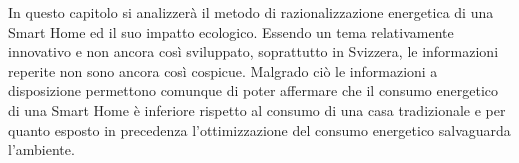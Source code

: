 In questo capitolo si analizzerà il metodo di razionalizzazione energetica di una Smart Home ed il suo impatto ecologico. Essendo un tema relativamente innovativo e non ancora così sviluppato, soprattutto in Svizzera, le informazioni reperite non sono ancora così cospicue. Malgrado ciò le informazioni a disposizione permettono comunque di poter affermare che il consumo energetico di una Smart Home è inferiore rispetto al consumo di una casa tradizionale e per quanto esposto in precedenza l’ottimizzazione del consumo energetico salvaguarda l’ambiente.